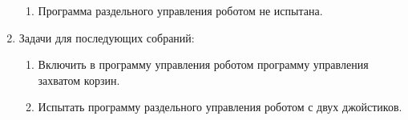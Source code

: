 \begin{enumerate}
\begin{enumerate}
		\item Программа раздельного управления роботом не испытана.
		
	\end{enumerate}
	
	\item Задачи для последующих собраний:
	\begin{enumerate}
		\item Включить в программу управления роботом программу управления захватом корзин.
		
		\item Испытать программу раздельного управления роботом с двух джойстиков.
		
	\end{enumerate}     
\end{enumerate}
\fillpage

